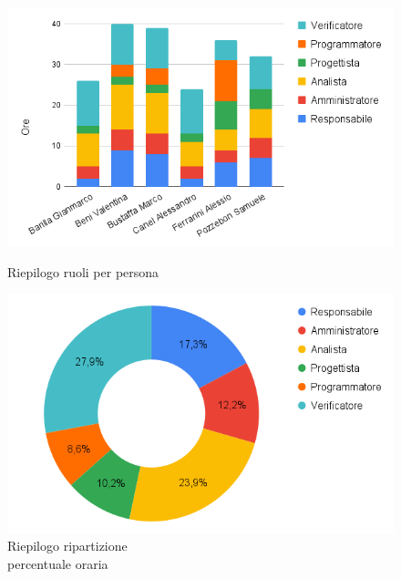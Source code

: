 \begin{figure}[h!]
	\centering
	\begin{minipage}[c]{0.44\textwidth}
    	\includegraphics[scale=0.42]{../../assets/Diagrammi_Excel/person_tot.png}
		\caption{Riepilogo ruoli per persona}
	\end{minipage}
\hfill
	\begin{minipage}[c]{0.46\textwidth}
		\includegraphics[scale=0.37]{../../assets/Diagrammi_Excel/tortatot.png}
		\caption{Riepilogo ripartizione\\ percentuale oraria}
	\end{minipage}
\end{figure}

\setlength\extrarowheight{0pt}



